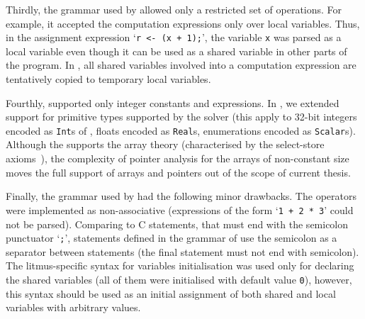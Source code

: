 Thirdly, the grammar used by \porthos{} allowed only a restricted set of operations.
For example, it accepted the computation expressions only over local variables.
Thus, in the assignment expression `\lstinline{r <- (x + 1);}', the variable \lstinline{x} was parsed as a local variable even though it can be used as a shared variable in other parts of the program.
In \porthos[2], all shared variables involved into a computation expression are tentatively copied to temporary local variables.

Fourthly, \porthos[1] supported only integer constants and expressions.
In \porthos[2], we extended support for primitive types supported by the  solver (this apply to 32-bit integers encoded as \texttt{Int}s of , floats encoded as \texttt{Real}s, enumerations encoded as \texttt{Scalar}s).
Although the  supports the array theory (characterised by the select-store axioms~\cite{de2011z3}), the complexity of pointer analysis for the arrays of non-constant size moves the full support of arrays and pointers out of the scope of current thesis.

Finally, the grammar used by \porthos{} had the following minor drawbacks. %
The operators were implemented as non-associative (expressions of the form `\lstinline{1 + 2 * 3}' could not be parsed).
Comparing to C statements, that must end with the semicolon punctuator `\lstinline{;}', statements defined in the grammar of \porthos[1] use the semicolon as a separator between statements (the final statement must not end with semicolon).
The litmus-specific syntax for variables initialisation was used only for declaring the shared variables (all of them were initialised with default value \lstinline{0}), however, this syntax should be used as an initial assignment of both shared and local variables with arbitrary values.

